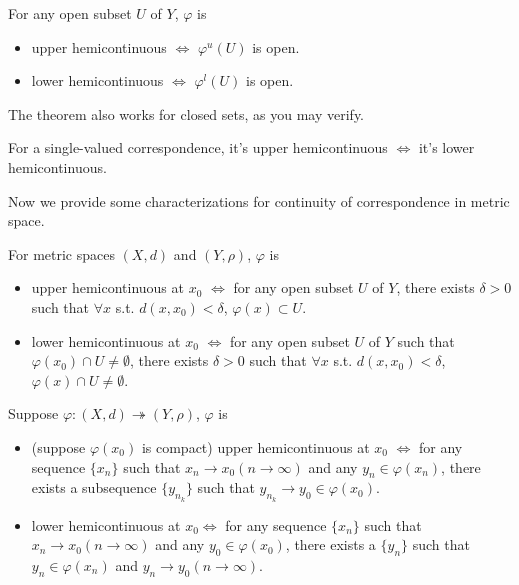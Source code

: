 \begin{theorem}
    For any open subset $U$ of $Y$, $\varphi$ is 
    \begin{itemize}
        \item upper hemicontinuous $\iff$ $\varphi^{u} (U)$ is open.
        \item lower hemicontinuous $\iff$ $\varphi^{l} (U)$ is open.
    \end{itemize}
    The theorem also works for closed sets, as you may verify.
\end{theorem}

\begin{theorem}
    For a single-valued correspondence, it's upper hemicontinuous $\iff$ it's lower hemicontinuous.
\end{theorem}

Now we provide some characterizations for continuity of correspondence in metric space.
\begin{theorem}
    For metric spaces $(X,d)$ and $(Y,\rho)$, $\varphi$ is
    \begin{itemize}
        \item upper hemicontinuous at $x_0$ $\iff$ for any open subset $U$ of $Y$, there exists $\delta>0$ such that $\forall x $ s.t. $d(x,x_0) <\delta$, $\varphi(x) \subset U$.
        \item lower hemicontinuous at $x_0$ $\iff$ for any open subset $U$ of $Y$ such that $\varphi(x_0) \cap U \neq \emptyset$, there exists $\delta>0$ such that $\forall x $ s.t. $d(x,x_0) <\delta$, $\varphi(x) \cap U \neq \emptyset$.
    \end{itemize} 
\end{theorem}

\begin{theorem}
    Suppose $\varphi: (X,d)\twoheadrightarrow (Y,\rho)$, $\varphi$ is
    \begin{itemize}
        \item (suppose $\varphi(x_0)$ is compact) upper hemicontinuous at $x_0$ $\iff$ for any sequence $\{x_n\}$ such that $x_n\to x_0(n\to \infty)$ and any $y_n\in \varphi(x_n)$, there exists a subsequence $\{y_{n_k}\}$ such that $y_{n_k} \to y_0 \in \varphi(x_0)$.
        \item lower hemicontinuous at $x_0 \iff$ for any sequence $\{x_n\}$ such that $x_n\to x_0(n\to \infty)$ and any $y_0 \in \varphi(x_0)$, there exists a $\{y_n\}$ such that $y_n\in \varphi(x_n)$ and $y_n\to y_0(n\to \infty)$.
    \end{itemize}
\end{theorem}

